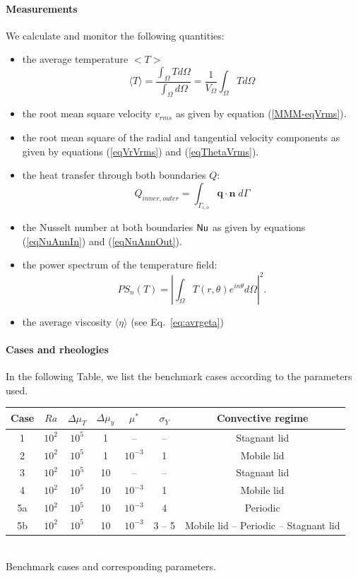 \paragraph{Measurements} We calculate and monitor the following quantities:
\begin{itemize}
\item the average temperature $<T>$
\begin{equation}
\langle T \rangle = \frac{\int_\Omega T  d\Omega }{\int_\Omega d \Omega }
=\frac{1}{V_\Omega}\int_\Omega T d\Omega
\end{equation}
\item the root mean square velocity $v_{rms}$ as given by equation (\ref{MMM-eqVrms}).
\item the root mean square of the radial and tangential velocity components as given 
by equations (\ref{eqVrVrms}) and (\ref{eqThetaVrms}).
\item the heat transfer through both boundaries $Q$:
\begin{equation}
Q_{inner, outer} = \int_{\Gamma_{i,o}} \boldsymbol{q} \cdot \boldsymbol{{n}} \; d\Gamma 
\end{equation}
\item the Nusselt number at both boundaries ${\mathsf{Nu}}$ as given by equations 
(\ref{eqNuAnnIn}) and  (\ref{eqNuAnnOut}). 
\item the power spectrum of the temperature field:
\begin{equation}
PS_n(T) = \left |\int_\Omega T(r, \theta) e^{in\theta} d\Omega \right |^2.
\end{equation}
\item the average viscosity $\langle \eta \rangle$ (see Eq.~\ref{eq:avrgeta})
\end{itemize}

\paragraph{Cases and rheologies}
In the following Table, we list the benchmark cases according to the parameters used. 
\begin{center}
\begin{tabular}{c c c c c c c} 
\hline
Case & $Ra$ & $\Delta\mu_T$ & $\Delta\mu_y$ & $\mu^*$ & $\sigma_Y$ & Convective regime \\
\hline
1   & $10^2$ & $10^5$    & 1  & -- & --             & Stagnant lid    \\
2   & $10^2$ & $10^5$    & 1  & $10^{-3}$ & 1       & Mobile lid \\
3   & $10^2$ & $10^5$    & 10 & --  & --            & Stagnant lid \\
4   & $10^2$ & $10^5$    & 10 & $10^{-3}$ & 1       & Mobile lid  \\
5a  & $10^2$ & $10^5$    & 10 & $10^{-3}$ & 4       & Periodic  \\
5b  & $10^2$ & $10^5$    & 10 & $10^{-3}$ & 3 -- 5  & Mobile lid -- Periodic -- Stagnant lid \\
\hline
\end{tabular}\\
{\small Benchmark cases and corresponding parameters.} 
\end{center}

